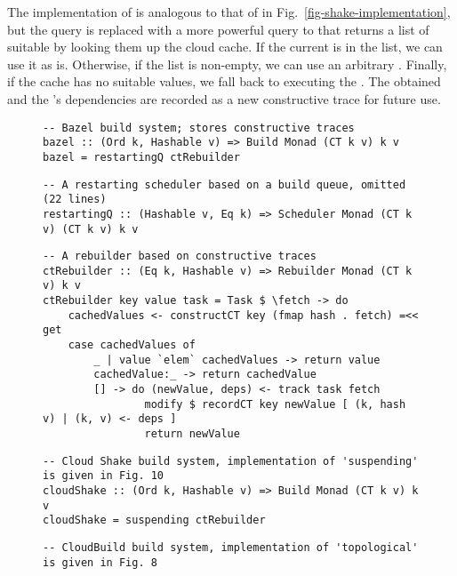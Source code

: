 The implementation of  is analogous to that of 
in Fig.~\ref{fig-shake-implementation}, but the  query is replaced
with a more powerful query to  that returns a list of suitable
 by looking them up the cloud cache. If the current 
is in the list, we can use it as is. Otherwise, if the list is non-empty, we can
use an arbitrary . Finally, if the cache has no suitable values,
we fall back to executing the . The obtained  and the
's dependencies are recorded as a new constructive trace for future
use.

\begin{figure}
\begin{verbatim}
-- Bazel build system; stores constructive traces
bazel :: (Ord k, Hashable v) => Build Monad (CT k v) k v
bazel = restartingQ ctRebuilder
\end{verbatim}
\vspace{0mm}
\begin{verbatim}
-- A restarting scheduler based on a build queue, omitted (22 lines)
restartingQ :: (Hashable v, Eq k) => Scheduler Monad (CT k v) (CT k v) k v
\end{verbatim}
\vspace{0mm}
\begin{verbatim}
-- A rebuilder based on constructive traces
ctRebuilder :: (Eq k, Hashable v) => Rebuilder Monad (CT k v) k v
ctRebuilder key value task = Task $ \fetch -> do
    cachedValues <- constructCT key (fmap hash . fetch) =<< get
    case cachedValues of
        _ | value `elem` cachedValues -> return value
        cachedValue:_ -> return cachedValue
        [] -> do (newValue, deps) <- track task fetch
                modify $ recordCT key newValue [ (k, hash v) | (k, v) <- deps ]
                return newValue
\end{verbatim}
\vspace{0mm}
\begin{verbatim}
-- Cloud Shake build system, implementation of 'suspending' is given in Fig. 10
cloudShake :: (Ord k, Hashable v) => Build Monad (CT k v) k v
cloudShake = suspending ctRebuilder
\end{verbatim}
\vspace{0mm}
\begin{verbatim}
-- CloudBuild build system, implementation of 'topological' is given in Fig. 8

\end{verbatim}
\end{figure}
